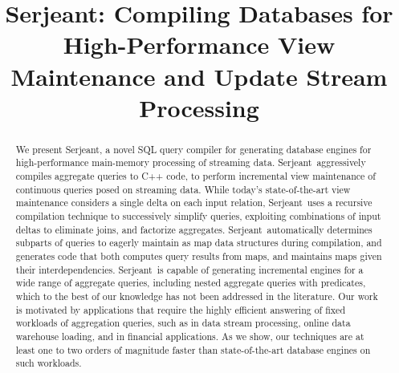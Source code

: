\documentclass{sig-alternate}
\newcommand{\compiler}{Serjeant}
\begin{document}
\title{Serjeant: Compiling Databases for High-Performance View Maintenance and Update Stream Processing}
\author{
}
\toappear{}
\maketitle

\begin{abstract}
We present \compiler, a novel SQL query compiler for generating database engines
for high-performance main-memory processing of streaming data. \compiler\
aggressively compiles aggregate queries to C++ code, to perform incremental view
maintenance of continuous queries posed on streaming data. While today's
state-of-the-art view maintenance considers a single delta on each input
relation, \compiler\ uses a recursive compilation technique to successively
simplify queries, exploiting combinations of input deltas to eliminate joins,
and factorize aggregates. \compiler\ automatically determines subparts of
queries to eagerly maintain as map data structures during compilation, and
generates code that both computes query results from maps, and maintains maps
given their interdependencies.  \compiler\ is capable of generating incremental
engines for a wide range of aggregate queries, including nested aggregate
queries with predicates, which to the best of our knowledge has not been
addressed in the literature.  Our work is motivated by applications that require
the highly efficient answering of fixed workloads of aggregation queries, such
as in data stream processing, online data warehouse loading, and in financial
applications. As we show, our techniques are at least one to two orders of
magnitude faster than state-of-the-art database engines on such workloads.
\end{abstract}




%





{\footnotesize


}
\end{document}
